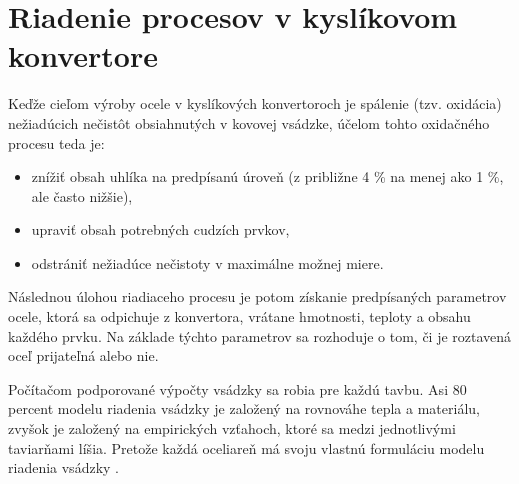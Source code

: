 \documentclass[]{tukediphc}
\begin{document}
\section{Riadenie procesov v kyslíkovom konvertore}

Keďže cieľom výroby ocele v kyslíkových konvertoroch je spálenie (tzv. oxidácia) nežiadúcich nečistôt obsiahnutých v kovovej vsádzke, účelom tohto oxidačného procesu teda je:

\begin{itemize}
	\item znížiť obsah uhlíka na predpísanú úroveň (z približne 4 \% na menej ako 1 \%, ale často nižšie),
	\item upraviť obsah potrebných cudzích prvkov,
	\item odstrániť nežiadúce nečistoty v maximálne možnej miere.
\end{itemize}

Následnou úlohou riadiaceho procesu je potom získanie predpísaných parametrov ocele, ktorá sa odpichuje z konvertora, vrátane hmotnosti, teploty a obsahu každého prvku. Na základe týchto parametrov sa rozhoduje o tom, či je roztavená oceľ prijateľná alebo nie.

Počítačom podporované výpočty vsádzky sa robia pre každú tavbu. Asi 80 percent modelu riadenia vsádzky je založený na rovnováhe tepla a materiálu, zvyšok je založený na empirických vzťahoch, ktoré sa medzi jednotlivými taviarňami líšia. Pretože každá oceliareň má svoju vlastnú formuláciu modelu riadenia vsádzky \cite{Turkdogan1996}.



%

%
\end{document}
